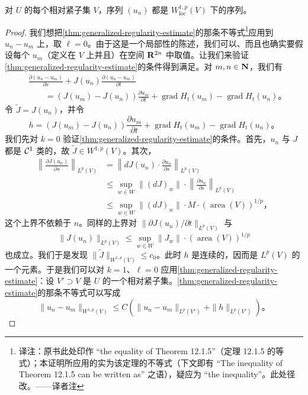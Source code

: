 \begin{lemma}\label{thm:un-cauchy-w1p}
对 $U$ 的每个相对紧\trOpen{}子集 $V$，序列 $(u_{n})$ 都是 $W^{1,p}_{\mathrm{loc}}(V)$ \trTopology{}下的\trCauchy{}序列。
\end{lemma}

\begin{proof}
我们想把\cref{thm:generalized-regularity-estimate}的那条不等式\footnote{译注：原书此处印作 “the equality of Theorem 12.1.5”（定理 12.1.5 的等式）；本证明所应用的实为该定理的不等式（下文即有 “The inequality of Theorem 12.1.5 can be written as” 之语），疑应为 “the inequality”。此处径改。——译者注}应用到 $u_{n}-u_{m}$ 上，取 $\ell=0$。由于这是一个局部性的陈述，我们可以、而且也确实要假设每个 $u_{m}$（定义在 $V$ 上并且）在\trEuclidean{}空间 $\mathbf{R}^{2n}$ 中取值。让我们来验证\cref{thm:generalized-regularity-estimate}的条件得到满足。对 $m,n\in\mathbf{N}$，我们有
\[
\begin{aligned}
&\frac{\partial(u_{n}-u_{m})}{\partial s}+J(u_{n})\frac{\partial(u_{n}-u_{m})}{\partial t}\\
&\qquad=(J(u_{m})-J(u_{n}))\frac{\partial u_{m}}{\partial t}+\operatorname{grad}H_{t}(u_{m})-\operatorname{grad}H_{t}(u_{n})\text{。}
\end{aligned}
\]
令 $\widetilde{J}=J(u_{n})$，并令
\[
h=(J(u_{m})-J(u_{n}))\frac{\partial u_{m}}{\partial t}+\operatorname{grad}H_{t}(u_{m})-\operatorname{grad}H_{t}(u_{n})\text{。}
\]
我们先对 $k=0$ 验证\cref{thm:generalized-regularity-estimate}的条件。首先，$u_{n}$ 与 $J$ 都是 $\mathcal{C}^{1}$ 类的，故 $\widetilde{J}\in W^{1,p}(V)$。其次，
\[
\begin{aligned}
\left\|\frac{\partial J(u_{n})}{\partial s}\right\|_{L^{p}(V)}&=\left\|dJ(u_{n})\cdot\frac{\partial u_{n}}{\partial s}\right\|_{L^{p}(V)}\\
&\le\sup_{w\in W}\|(dJ)_{w}\|\cdot\left\|\frac{\partial u_{n}}{\partial s}\right\|_{L^{p}(V)}\\
&\le\sup_{w\in W}\|(dJ)_{w}\|\cdot M\cdot(\operatorname{area}(V))^{1/p}\text{，}
\end{aligned}
\]
这个上界不依赖于 $n$。同样的上界对 $\|\partial J(u_{n})/\partial t\|_{L^{p}(V)}$ 与
\[
\|J(u_{n})\|_{L^{p}(V)}\le\sup_{w\in W}\|J_{w}\|\cdot(\operatorname{area}(V))^{1/p}
\]
也成立。我们于是发现 $\|\widetilde{J}\|_{W^{1,p}(V)}\le c_{0}$。此时 $h$ 是连续的，因而是 $L^{p}(V)$ 的一个元素。于是我们可以对 $k=1$、$\ell=0$ 应用\cref{thm:generalized-regularity-estimate}：设 $V'\supset V$ 是 $U$ 的一个相对紧\trOpen{}子集。\cref{thm:generalized-regularity-estimate}的那条不等式可以写成
\[
\|u_{n}-u_{m}\|_{W^{1,p}(V)}\le C\left(\|u_{n}-u_{m}\|_{L^{p}(V')}+\|h\|_{L^{p}(V')}\right)\text{。}
\]
\end{proof}
